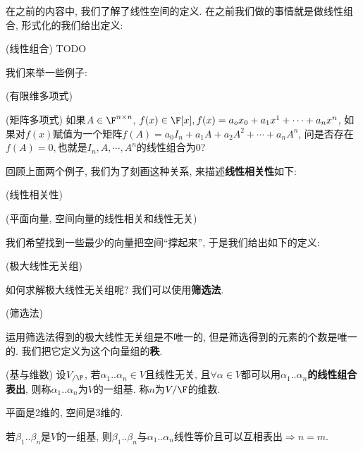 在之前的内容中, 我们了解了线性空间的定义. 在之前我们做的事情就是做线性组合, 形式化的我们给出定义: 
\begin{defn}
(线性组合) TODO
\end{defn}
我们来举一些例子:
\begin{example}
(有限维多项式)
\end{example}
%
\begin{example}
(矩阵多项式) 如果$A\in\F^{n\times n}$, $f(x)\in\F[x],f(x)=a_{o}x_{0}+a_{1}x^{1}+\cdots+a_{n}x^{n}$,
如果对$f(x)$赋值为一个矩阵$f(A)=a_{0}I_{n}+a_{1}A+a_{2}A^{2}+\cdots+a_{n}A^{n}$,
问是否存在$f(A)=0,$也就是$I_{n},A,\cdots,A^{n}$的线性组合为0?
\end{example}
回顾上面两个例子, 我们为了刻画这种关系, 来描述\textbf{线性相关性}如下:
\begin{defn}
(线性相关性)
\end{defn}
\begin{example}
(平面向量, 空间向量的线性相关和线性无关)
\end{example}
我们希望找到一些最少的向量把空间``撑起来'', 于是我们给出如下的定义:
\begin{defn}
(极大线性无关组)
\end{defn}
如何求解极大线性无关组呢? 我们可以使用\textbf{筛选法}. 
\begin{defn}
(筛选法)
\end{defn}
运用筛选法得到的极大线性无关组是不唯一的, 但是筛选得到的元素的个数是唯一的. 我们把它定义为这个向量组的\textbf{秩}.
\begin{defn}
(基与维数) 设$V_{/\F}$, 若$\alpha_{1}..\alpha_{n}\in V$且线性无关, 且$\forall\alpha\in V$都可以用$\alpha_{1}..\alpha_{n}$\textbf{的线性组合表出},
则称$\alpha_{1}..\alpha_{n}$为$V$的一组基. 称$n$为$V/\F$的维数. 
\end{defn}
\begin{example}
平面是2维的, 空间是3维的. 
\end{example}
\begin{thm}
\label{base-represent-ok}若$\beta_{1}..\beta_{n}$是$V$的一组基, 则$\beta_{1}..\beta_{n}$与$\alpha_{1}..\alpha_{n}$线性等价且可以互相表出$\Rightarrow$$n=m$. 
\end{thm}
